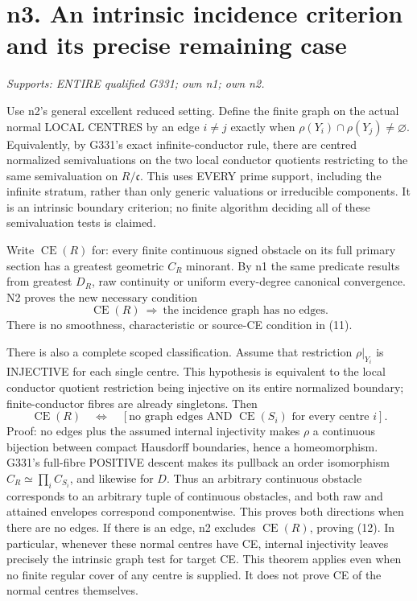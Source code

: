 \section{n3. An intrinsic incidence criterion and its precise remaining case}
\textit{Supports: ENTIRE qualified G331; own n1; own n2.}

Use n2's general excellent reduced setting. Define the finite graph on the
actual normal LOCAL CENTRES by an edge $i\ne j$ exactly when
$\rho(Y_i)\cap\rho(Y_j)\ne\varnothing$. Equivalently, by G331's exact
infinite-conductor rule, there are centred normalized semivaluations on
the two local conductor quotients restricting to the same semivaluation
on $R/\mathfrak c$. This uses EVERY prime support, including the infinite
stratum, rather than only generic valuations or irreducible components.
It is an intrinsic boundary criterion; no finite algorithm deciding all
of these semivaluation tests is claimed.

Write $\operatorname{CE}(R)$ for: every finite continuous signed obstacle
on its full primary section has a greatest geometric $C_R$ minorant.
By n1 the same predicate results from greatest $D_R$, raw continuity or
uniform every-degree canonical convergence. N2 proves the new necessary
condition
\[
                 \operatorname{CE}(R)\ \Longrightarrow\
                 \text{the incidence graph has no edges}.       \tag{11}
\]
There is no smoothness, characteristic or source-CE condition in (11).

There is also a complete scoped classification. Assume that restriction
$\rho|_{Y_i}$ is INJECTIVE for each single centre. This hypothesis is
equivalent to the local conductor quotient restriction being injective
on its entire normalized boundary; finite-conductor fibres are already
singletons. Then
\[
 \operatorname{CE}(R)\quad\Longleftrightarrow\quad
 \left[\text{no graph edges AND }\operatorname{CE}(S_i)
                  \text{ for every centre }i\right].             \tag{12}
\]
Proof: no edges plus the assumed internal injectivity makes $\rho$ a
continuous bijection between compact Hausdorff boundaries, hence a
homeomorphism. G331's full-fibre POSITIVE descent makes its pullback an
order isomorphism $C_R\simeq\prod_i C_{S_i}$, and likewise for $D$.
Thus an arbitrary continuous obstacle corresponds to an arbitrary tuple
of continuous obstacles, and both raw and attained envelopes correspond
componentwise. This proves both directions when there are no edges.
If there is an edge, n2 excludes $\operatorname{CE}(R)$, proving (12).
In particular, whenever these normal centres have CE, internal
injectivity leaves precisely the intrinsic graph test for target CE.
This theorem applies even when no finite regular cover of any centre is
supplied. It does not prove CE of the normal centres themselves.

